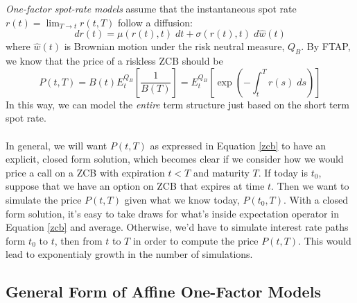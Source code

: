 \documentclass[a4paper,12pt]{scrartcl}
\begin{document}
\emph{One-factor spot-rate models} assume that the instantaneous
spot rate $r(t) = \lim_{T\rightarrow t} r(t,T)$ follow a diffusion:
\begin{equation}
   dr(t) = \mu(r(t),t) \; dt + \sigma(r(t),t) \; d\hat{w}(t)
\end{equation}
where $\hat{w}(t)$ is Brownian motion under the risk neutral measure,
$Q_B$. By FTAP, we know that the price of a riskless ZCB should be
\begin{equation}
   \label{zcb}
   P(t,T) = B(t) E_t^{Q_B}\left[ \frac{1}{B(T)}\right] = 
   E_t^{Q_B} \left[ \exp\left( - \int^T_t r(s) \; ds \right) \right]
\end{equation}
In this way, we can model the \emph{entire} term structure just based
on the short term spot rate.
\\
\\
In general, we will want $P(t,T)$ as expressed in Equation \ref{zcb}
to have an explicit, closed form solution, which becomes clear if we
consider how we would price a call on a ZCB with expiration $t<T$
and maturity $T$. If today is $t_0$, suppose that we have an option
on ZCB that expires at time $t$. Then we want to simulate the price
$P(t,T)$ given what we know today, $P(t_0,T)$. With a closed form
solution, it's easy to take draws for what's inside expectation
operator in Equation \ref{zcb} and average. Otherwise, we'd have
to simulate interest rate paths form $t_0$ to $t$, then from
$t$ to $T$ in order to compute the price $P(t,T)$. This would lead
to exponentialy growth in the number of simulations.

\subsection{General Form of Affine One-Factor Models}
\end{document}
